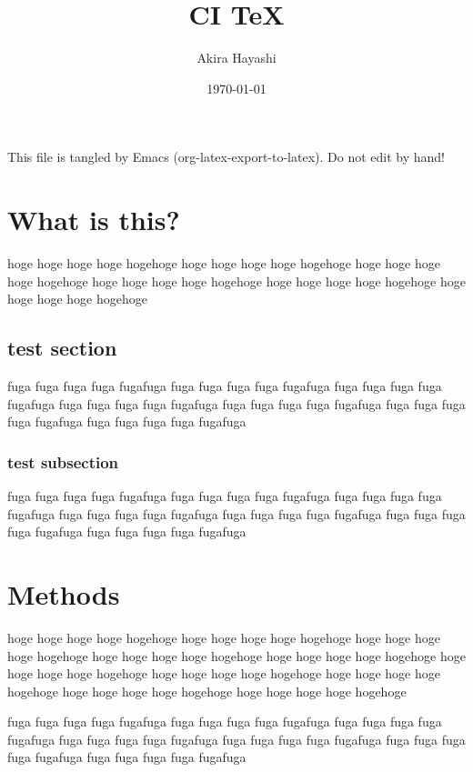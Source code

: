 \documentclass[11pt]{article}
\author{Akira Hayashi}
\date{\today}
\title{CI \TeX}
\begin{document}
\maketitle
\tableofcontents

This file is tangled by Emacs (org-latex-export-to-latex).
Do not edit by hand!
\section{What is this?}
\label{sec:org39af5bd}
hoge hoge hoge hoge hogehoge
hoge hoge hoge hoge hogehoge
hoge hoge hoge hoge hogehoge
hoge hoge hoge hoge hogehoge
hoge hoge hoge hoge hogehoge
hoge hoge hoge hoge hogehoge
\subsection{test section}
\label{sec:org3e47c6e}

fuga fuga fuga fuga fugafuga
fuga fuga fuga fuga fugafuga
fuga fuga fuga fuga fugafuga
fuga fuga fuga fuga fugafuga
fuga fuga fuga fuga fugafuga
fuga fuga fuga fuga fugafuga
fuga fuga fuga fuga fugafuga

\subsubsection{test subsection}
\label{sec:org9353144}

fuga fuga fuga fuga fugafuga
fuga fuga fuga fuga fugafuga
fuga fuga fuga fuga fugafuga
fuga fuga fuga fuga fugafuga
fuga fuga fuga fuga fugafuga
fuga fuga fuga fuga fugafuga
fuga fuga fuga fuga fugafuga

\section{Methods}
\label{sec:orga619c00}
hoge hoge hoge hoge hogehoge
hoge hoge hoge hoge hogehoge
hoge hoge hoge hoge hogehoge
hoge hoge hoge hoge hogehoge
hoge hoge hoge hoge hogehoge
hoge hoge hoge hoge hogehoge
hoge hoge hoge hoge hogehoge
hoge hoge hoge hoge hogehoge
hoge hoge hoge hoge hogehoge
hoge hoge hoge hoge hogehoge


fuga fuga fuga fuga fugafuga
fuga fuga fuga fuga fugafuga
fuga fuga fuga fuga fugafuga
fuga fuga fuga fuga fugafuga
fuga fuga fuga fuga fugafuga
fuga fuga fuga fuga fugafuga
fuga fuga fuga fuga fugafuga
\end{document}
